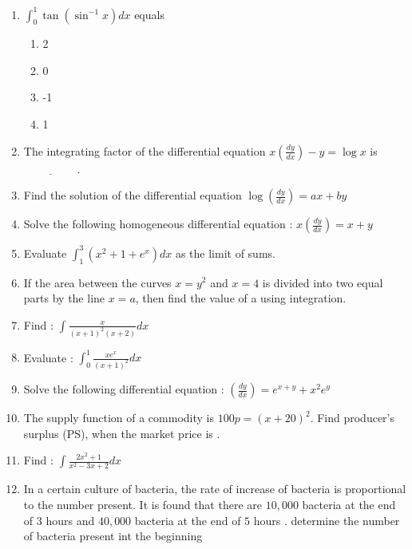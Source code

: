 \documentclass[12pt,-letter paper]{article}
\providecommand{\brak}[1]{\ensuremath{\left(#1\right)}}
\begin{document}
\begin{enumerate}
\begin{enumerate}
      \end{enumerate}
      \item $\int_{0}^1 \tan (\sin ^{-1}x) dx$ equals 
      \begin{enumerate}
          \item  2
          \item  0
          \item -1
          \item  1
      \end{enumerate}
      \item The integrating factor of the differential equation 
      $x\brak {\frac{dy}{dx}}-y= \log x$ is $\underline{\hspace{2cm}}$.
      \item Find the solution of the differential equation $\log \brak{\frac{dy}{dx}} = ax +by$
      \item Solve the following homogeneous differential equation : 
      $x \brak{\frac{dy}{dx}} = x + y$
      \item Evaluate $\int_{1}^3 (x^2 + 1 + e^x )dx$ as the limit of sums.
      \item If the area between the curves $x = y^2$  and $x = 4$ is divided into two equal parts by the line $x = a$, then find the value  of a using integration.
      \item Find : $\int \frac{x}{(x + 1 )^2 (x + 2)}dx$
      \item Evaluate : $\int_{0}^1 \frac{xe^x}{(x + 1)^2 } dx$
      \item Solve the following differential equation : $\brak {\frac{dy}{dx}} = e^{x+y} + x^2e^y$ 
      \item The supply function of  a commodity is $100p = (x+20)^2$. Find producer's surplus (PS), when the market price is .
      \item Find : $\int \frac{2x^2 + 1}{x^2 - 3x + 2}dx$
      \item In a certain culture of bacteria, the rate of increase of bacteria is proportional to the number present. It is found that there are $10,000$ bacteria at the end of $3$ hours and $40,000$ bacteria at the end of $5$ hours . determine the number of bacteria present int the beginning 
                 
\end{enumerate}
\end{document}
